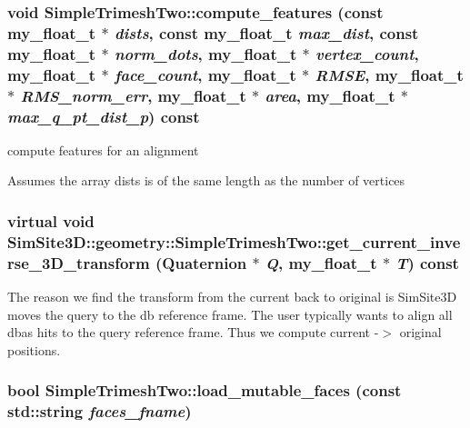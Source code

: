 \subsubsection{\setlength{\rightskip}{0pt plus 5cm}void Simple\-Trimesh\-Two::compute\_\-features (const my\_\-float\_\-t $\ast$ {\em dists}, const my\_\-float\_\-t {\em max\_\-dist}, const my\_\-float\_\-t $\ast$ {\em norm\_\-dots}, my\_\-float\_\-t $\ast$ {\em vertex\_\-count}, my\_\-float\_\-t $\ast$ {\em face\_\-count}, my\_\-float\_\-t $\ast$ {\em RMSE}, my\_\-float\_\-t $\ast$ {\em RMS\_\-norm\_\-err}, my\_\-float\_\-t $\ast$ {\em area}, my\_\-float\_\-t $\ast$ {\em max\_\-q\_\-pt\_\-dist\_\-p}) const}\label{classSimSite3D_1_1geometry_1_1SimpleTrimeshTwo_dc04eadf0d6585ebd118e6b3fd76402e}


compute features for an alignment 

Assumes the array dists is of the same length as the number of vertices 
\subsubsection{\setlength{\rightskip}{0pt plus 5cm}virtual void SimSite3D::geometry::Simple\-Trimesh\-Two::get\_\-current\_\-inverse\_\-3D\_\-transform (Quaternion $\ast$ {\em Q}, my\_\-float\_\-t $\ast$ {\em T}) const\hspace{0.3cm}{\tt  [inline, virtual]}}\label{classSimSite3D_1_1geometry_1_1SimpleTrimeshTwo_3fcbc1c1ac5c6e9443bfcf6c98a8c7c4}


The reason we find the transform from the current back to original is Sim\-Site3D moves the query to the db reference frame. The user typically wants to align all dbas hits to the query reference frame. Thus we compute current -$>$ original positions. 
\subsubsection{\setlength{\rightskip}{0pt plus 5cm}bool Simple\-Trimesh\-Two::load\_\-mutable\_\-faces (const std::string {\em faces\_\-fname})\hspace{0.3cm}{\tt  [private]}}\label{classSimSite3D_1_1geometry_1_1SimpleTrimeshTwo_95efedbd9a7a3bb583b5e604eeed7015}


